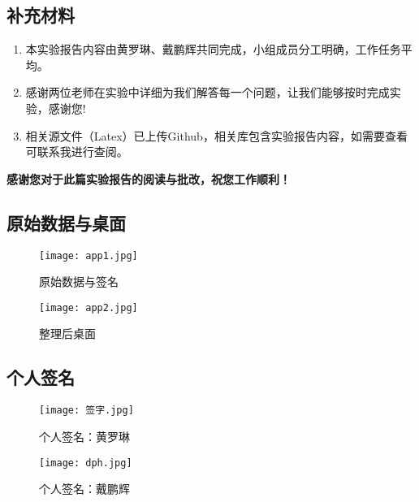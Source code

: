 
\clearpage
{}

\subsection{补充材料}

\begin{enumerate}
	\item 本实验报告内容由黄罗琳、戴鹏辉共同完成，小组成员分工明确，工作任务平均。
	\item 感谢两位老师在实验中详细为我们解答每一个问题，让我们能够按时完成实验，感谢您!
	\item 相关源文件（Latex）已上传Github，相关库包含实验报告内容，如需要查看可联系我进行查阅。
\end{enumerate}
\quad \large \textbf{感谢您对于此篇实验报告的阅读与批改，祝您工作顺利！}

\subsection{原始数据与桌面}
\begin{figure}[H]
    \centering
    \begin{minipage}{0.4\textwidth} %
        \centering
        \texttt{[image: app1.jpg]}
        \caption{原始数据与签名}
        \label{}
    \end{minipage}%
    \hfill
    \begin{minipage}{0.4\textwidth} %
        \centering
        \texttt{[image: app2.jpg]}
        \caption{整理后桌面}
        \label{}
    \end{minipage}
\end{figure}

\subsection{个人签名}
\begin{figure}[H]
    \centering
    \begin{minipage}{0.45\textwidth} %
        \centering
        \texttt{[image: 签字.jpg]}
        \caption{个人签名：黄罗琳}
        \label{}
    \end{minipage}%
    \hfill
    \begin{minipage}{0.45\textwidth} %
        \centering
        \texttt{[image: dph.jpg]}
        \caption{个人签名：戴鹏辉}
        \label{}
    \end{minipage}
\end{figure}

